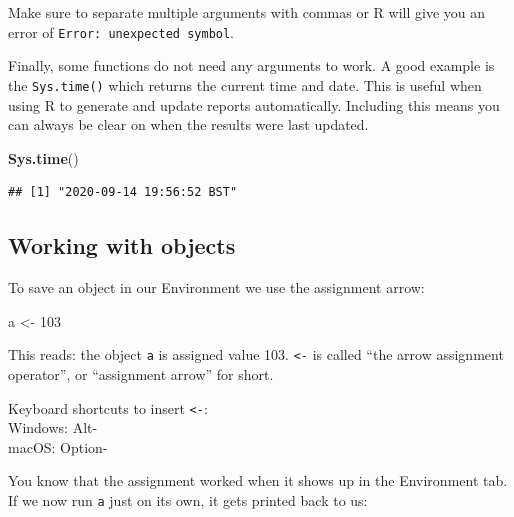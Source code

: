\documentclass[
  12pt,
  krantz2]{krantz}
\makeatletter
\newenvironment{Shaded}{\begin{snugshade}}{\end{snugshade}}
\newcommand{\DecValTok}[1]{\textcolor[rgb]{0.00,0.00,0.81}{#1}}
\newcommand{\KeywordTok}[1]{\textcolor[rgb]{0.13,0.29,0.53}{\textbf{#1}}}
\newcommand{\NormalTok}[1]{#1}
\newcommand{\StringTok}[1]{\textcolor[rgb]{0.31,0.60,0.02}{#1}}
\renewenvironment{quote}{\begin{VF}}{\end{VF}}
\newenvironment{kframe}{%
\medskip{}
\setlength{\fboxsep}{.8em}
 \def\at@end@of@kframe{}%
 \ifinner\ifhmode%
  \def\at@end@of@kframe{\end{minipage}}%
  \begin{minipage}{\columnwidth}%
 \fi\fi%
 \def\FrameCommand##1{\hskip\@totalleftmargin \hskip-\fboxsep
 \colorbox{shadecolor}{##1}\hskip-\fboxsep
     \hskip-\linewidth \hskip-\@totalleftmargin \hskip\columnwidth}%
 \MakeFramed {\advance\hsize-\width
   \@totalleftmargin\z@ \linewidth\hsize
   \@setminipage}}%
 {\par\unskip\endMakeFramed%
 \at@end@of@kframe}
\renewenvironment{Shaded}{\begin{kframe}}{\end{kframe}}
\makeatother
\begin{document}
\begin{quote}
Make sure to separate multiple arguments with commas or R will give you an error of \texttt{Error:\ unexpected\ symbol}.
\end{quote}

Finally, some functions do not need any arguments to work.
A good example is the \texttt{Sys.time()} which returns the current time and date.
This is useful when using R to generate and update reports automatically.
Including this means you can always be clear on when the results were last updated.


\begin{Shaded}
\begin{Highlighting}[]
\KeywordTok{Sys.time}\NormalTok{()}
\end{Highlighting}
\end{Shaded}

\begin{verbatim}
## [1] "2020-09-14 19:56:52 BST"
\end{verbatim}

\hypertarget{working-with-objects}{%
\subsection{Working with objects}\label{working-with-objects}}

To save an object in our Environment we use the assignment arrow:

\begin{Shaded}
\begin{Highlighting}[]
\NormalTok{a <-}\StringTok{ }\DecValTok{103}
\end{Highlighting}
\end{Shaded}

This reads: the object \texttt{a} is assigned value 103.
\texttt{\textless{}-} is called ``the arrow assignment operator'', or ``assignment arrow'' for short.

\begin{quote}
Keyboard shortcuts to insert \texttt{\textless{}-}:\\
Windows: Alt-\\
macOS: Option-
\end{quote}

You know that the assignment worked when it shows up in the Environment tab.
If we now run \texttt{a} just on its own, it gets printed back to us:
\end{document}

